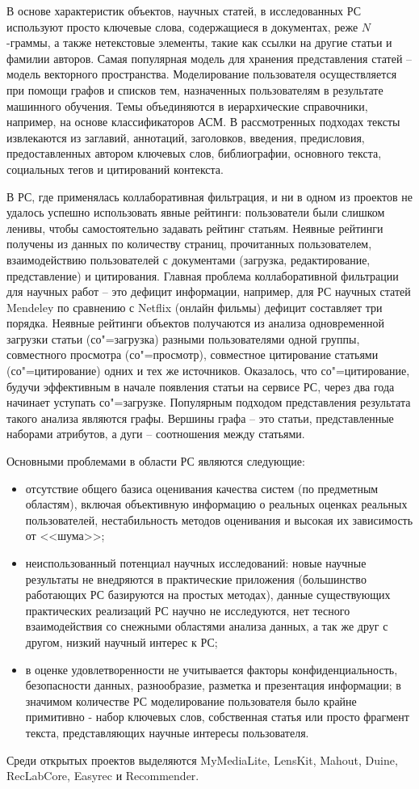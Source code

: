 \documentclass[a4paper,14pt,openany,final]{extreport} %
\begin{document}
В основе характеристик объектов, научных статей, в исследованных РС используют просто ключевые слова, содержащиеся в документах, реже \(N\)-граммы, а также нетекстовые элементы, такие как ссылки на другие статьи и фамилии авторов. Самая популярная модель для хранения представления статей -- модель векторного пространства. Моделирование пользователя осуществляется при помощи графов и списков тем, назначенных пользователям в результате машинного обучения. Темы объединяются в иерархические справочники, например, на основе классификаторов АСМ. В рассмотренных подходах тексты извлекаются из заглавий, аннотаций, заголовков, введения, предисловия, предоставленных автором ключевых слов, библиографии, основного текста, социальных тегов и цитирований контекста.

В РС, где применялась коллаборативная фильтрация, и ни в одном из проектов не удалось успешно использовать явные рейтинги: пользователи были слишком ленивы, чтобы самостоятельно задавать рейтинг статьям. Неявные рейтинги получены из данных по количеству страниц, прочитанных пользователем, взаимодействию пользователей с документами (загрузка, редактирование, представление) и цитирования. Главная проблема коллаборативной фильтрации для научных работ -- это дефицит информации, например, для РС научных статей Mendeley по сравнению с Netflix (онлайн фильмы) дефицит составляет три порядка.  Неявные рейтинги объектов получаются из анализа одновременной загрузки статьи (со"=загрузка) разными пользователями одной группы, совместного просмотра (со"=просмотр), совместное цитирование статьями (со"=цитирование) одних и тех же источников. Оказалось, что со"=цитирование, будучи эффективным в начале появления статьи на сервисе РС, через два года начинает уступать со"=загрузке. Популярным подходом представления результата такого анализа являются графы. Вершины графа -- это статьи, представленные наборами атрибутов, а дуги -- соотношения между статьями.

Основными проблемами в области РС являются следующие:
\begin{itemize}
\item отсутствие общего базиса оценивания качества систем (по
  предметным областям), включая объективную информацию о реальных
  оценках реальных пользователей, нестабильность методов оценивания и
  высокая их зависимость от <<шума>>;
\item неиспользованный потенциал
  научных исследований: новые научные результаты не внедряются в
  практические приложения (большинство работающих РС базируются на
  простых методах), данные существующих практических реализаций РС
  научно не исследуются, нет тесного взаимодействия со снежными
  областями анализа данных, а так же друг с другом, низкий научный
  интерес к РС;
\item в оценке удовлетворенности не учитывается факторы
  конфиденциальность, безопасности данных, разнообразие, разметка и
  презентация информации; в значимом количестве РС моделирование
  пользователя было крайне примитивно - набор ключевых слов,
  собственная статья или просто фрагмент текста, представляющих
  научные интересы пользователя.
\end{itemize}
    Среди открытых проектов выделяются MyMediaLite, LensKit, Mahout, Duine, RecLabCore, Easyrec и Recommender.
\end{document}
